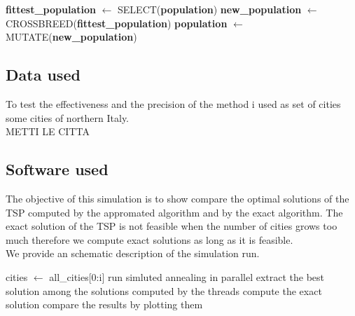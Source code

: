 \documentclass{article}
\begin{document}
\begin{algorithm}[H]
    \begin{algorithmic}[1]
        \State \textbf{fittest\_population} $\leftarrow$ SELECT(\textbf{population})
        \State \textbf{new\_population} $\leftarrow$ CROSSBREED(\textbf{fittest\_population})
       \State \textbf{population} $\leftarrow$ MUTATE(\textbf{new\_population})
       \EndFunction
\end{algorithmic}
\end{algorithm}

\subsection{Data used}
To test the effectiveness and the precision of the method i used as set of cities some cities of northern Italy. \\
METTI LE CITTA
\\

\subsection{Software used}
The objective of this simulation is to show compare the optimal solutions of the TSP computed by the appromated algorithm and by the exact algorithm. The exact solution of the TSP is not feasible when the number of cities grows too much therefore we compute exact solutions as long as it is feasible. \\
We provide an schematic description of the simulation run. 
\begin{algorithm}[H]
    \begin{algorithmic}[1]
       	\State  cities $\leftarrow$ all\_cities[0:i]
       		\State run simluted annealing in parallel
       	\EndFor 
       	\State extract the best solution among the solutions computed by the threads
       		\State compute the exact solution
       	\EndIf
       	\State compare the results by plotting them
       \EndFor
       \EndFunction
\end{algorithmic}
\end{algorithm}
\end{document}

